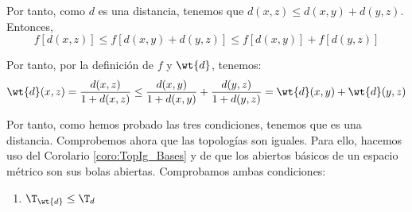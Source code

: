 \begin{ejercicio}
\begin{enumerate}
        
        Por tanto, como $d$ es una distancia, tenemos que $d(x,z)\leq d(x,y) + d(y,z)$. Entonces,
        \begin{equation*}
            f[d(x,z)]\leq f[d(x,y) + d(y,z)] \leq f[d(x,y)] + f[d(y,z)]
        \end{equation*}

        Por tanto, por la definición de $f$ y $\wt{d}$, tenemos:
       \begin{equation*}
           \wt{d}(x,z) = \frac{d(x,z)}{1+d(x,z)} \leq \frac{d(x,y)}{1+d(x,y)} + \frac{d(y,z)}{1+d(y,z)} = \wt{d}(x,y) + \wt{d}(y,z)
       \end{equation*} 
    \end{enumerate}

    Por tanto, como hemos probado las tres condiciones, tenemos que es una distancia. Comprobemos ahora que las topologías son iguales. Para ello, hacemos uso del Corolario \ref{coro:TopIg_Bases} y de que los abiertos básicos de un espacio métrico son sus bolas abiertas. Comprobamos ambas condiciones:
    \begin{comment}
    Para ello, simplemente comprobamos que las distancias son equivalentes, es decir, $\exists a,b\in \bb{R}^+$ tal que:
    \begin{equation*}
        a\wt{d}(x,y) \leq d(x,y)\leq b\wt{d}(x,y)
    \end{equation*}

    Suponemos $x\neq y$, ya que en ese caso se tiene para cualesquiera valores de $a,b$. Buscamos en primer lugar el valor de $a$:
    \begin{equation*}
        \frac{ad(x,y)}{1+d(x,y)} = a\wt{d}(x,y)\leq d(x,y)
        \Longleftrightarrow
        \frac{a}{1+d(x,y)} \leq 1
        \Longleftrightarrow
        a\leq 1+d(x,y)
    \end{equation*}

    Tomamos por tanto $a=1$. Busquemos el valor de $b$:
    \begin{equation*}
        d(x,y)\leq b\wt{d}(x,y) = \frac{bd(x,y)}{1+d(x,y)}
        \Longleftrightarrow
        1\leq \frac{b}{1+d(x,y)}
        \Longleftrightarrow
        1+d(x,y)\leq b
    \end{equation*}

    Por tanto, como no podemos determinar un valor de $b$, tenemos que no son equivalentes.
    \end{comment}

    \begin{enumerate}
        \item \ul{$\T_{\wt{d}}\leq \T_d$}


\end{enumerate}
\end{ejercicio}

